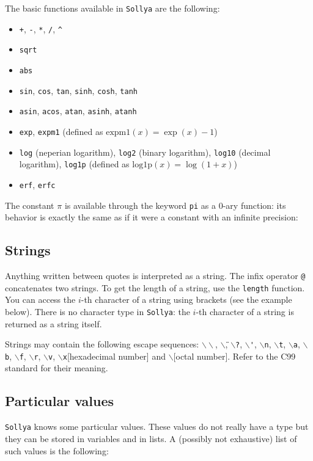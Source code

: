 \documentclass[a4paper]{article}
\newcommand{\com}[1]{\texttt{#1}}
\newcommand{\key}[1]{\texttt{#1}}
\newcommand{\sollya}{\texttt{Sollya}\xspace}
\begin{document}
The basic functions available in \sollya are the following:
\begin{itemize}
\item \com{+}, \com{-}, \com{*}, \com{/}, \com{\^{}}
\item \com{sqrt}
\item \com{abs}
\item \com{sin}, \com{cos}, \com{tan}, \com{sinh}, \com{cosh}, \com{tanh}
\item \com{asin}, \com{acos}, \com{atan}, \com{asinh}, \com{atanh}
\item \com{exp}, \com{expm1} (defined as $\mathrm{expm1}(x) = \exp(x)-1$)
\item \com{log} (neperian logarithm), \com{log2} (binary logarithm), \com{log10} (decimal logarithm), \com{log1p} (defined as $\mathrm{log1p}(x) = \log(1+x)$)
\item \com{erf}, \com{erfc}
\end{itemize}

The constant $\pi$ is available through the keyword \key{pi} as a $0$-ary function: its behavior is exactly the same as if it were a constant with an infinite precision:



\subsection{Strings}
Anything written between quotes is interpreted as a string. The infix operator \com{@} concatenates two strings. To get the length of a string, use the \com{length} function. You can access the $i$-th character of a string using brackets (see the example below). There is no character type in \sollya: the $i$-th character of a string is returned as a string itself.



Strings may contain the following escape sequences:
\texttt{$\backslash\backslash$}, \texttt{$\backslash$\"},
\texttt{$\backslash$?}, \texttt{$\backslash$\'},
\texttt{$\backslash$n}, \texttt{$\backslash$t},
\texttt{$\backslash$a}, \texttt{$\backslash$b},
\texttt{$\backslash$f}, \texttt{$\backslash$r},
\texttt{$\backslash$v}, \texttt{$\backslash$x}[hexadecimal number] and
\texttt{$\backslash$}[octal number]. Refer to the C99 standard for their
meaning.

\subsection{Particular values}
\sollya knows some particular values. These values do not really have a type but they can be stored in variables and in lists. A (possibly not exhaustive) list of such values is the following:
\end{document}
